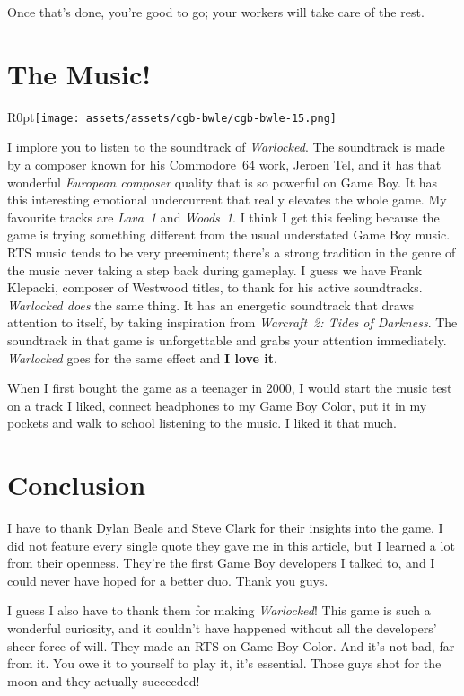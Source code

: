 \documentclass{book}
\begin{document}
\FloatBarrier\vspace{\baselineskip}\begin{figure}[H]\end{figure}
Once that’s done, you’re good to go; your workers will take care of the rest.\par
\FloatBarrier\section*{The Music!}
\begin{wrapfigure}{R}{0pt}{\texttt{[image: assets/assets/cgb-bwle/cgb-bwle-15.png]}}\end{wrapfigure}
I implore you to listen to the soundtrack of \emph{Warlocked}. The soundtrack is made by a composer known for his Commodore~64 work, Jeroen Tel, and it has that wonderful \emph{European composer} quality that is so powerful on Game Boy. It has this interesting emotional undercurrent that really elevates the whole game. My favourite tracks are \emph{Lava~1} and \emph{Woods~1}. I think I get this feeling because the game is trying something different from the usual understated Game Boy music. RTS music tends to be very preeminent; there’s a strong tradition in the genre of the music never taking a step back during gameplay. I guess we have Frank Klepacki, composer of Westwood titles, to thank for his active soundtracks. \emph{Warlocked does} the same thing. It has an energetic soundtrack that draws attention to itself, by taking inspiration from \emph{Warcraft~2: Tides of Darkness}. The soundtrack in that game is unforgettable and grabs your attention immediately. \emph{Warlocked} goes for the same effect and \textbf{I love it}.\par
When I first bought the game as a teenager in 2000, I would start the music test on a track I liked, connect headphones to my Game Boy Color, put it in my pockets and walk to school listening to the music. I liked it that much.\par
\FloatBarrier\section*{Conclusion}
I have to thank Dylan Beale and Steve Clark for their insights into the game. I did not feature every single quote they gave me in this article, but I learned a lot from their openness. They’re the first Game Boy developers I talked to, and I could never have hoped for a better duo. Thank you guys.\par
I guess I also have to thank them for making \emph{Warlocked}! This game is such a wonderful curiosity, and it couldn’t have happened without all the developers’ sheer force of will. They made an RTS on Game Boy Color. And it’s not bad, far from it. You owe it to yourself to play it, it’s essential. Those guys shot for the moon and they actually succeeded!\par
\FloatBarrier\vspace{\baselineskip}\begin{figure}[H]\end{figure}
\end{document}

